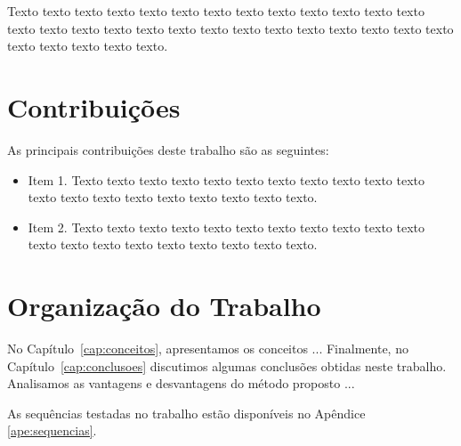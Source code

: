 Texto texto texto texto texto texto texto texto texto texto texto texto texto
texto texto texto texto texto texto texto texto texto texto texto texto texto
texto texto texto texto texto texto.

\section{Contribuições}
\label{sec:contribucoes}

As principais contribuições deste trabalho são as seguintes:

\begin{itemize}
  \item Item 1. Texto texto texto texto texto texto texto texto texto texto
  texto texto texto texto texto texto texto texto texto texto.

  \item Item 2. Texto texto texto texto texto texto texto texto texto texto
  texto texto texto texto texto texto texto texto texto texto.

\end{itemize}

\section{Organização do Trabalho}
\label{sec:organizacao_trabalho}

No Capítulo~\ref{cap:conceitos}, apresentamos os conceitos ... Finalmente, no
Capítulo~\ref{cap:conclusoes} discutimos algumas conclusões obtidas neste
trabalho. Analisamos as vantagens e desvantagens do método proposto ... 

As sequências testadas no trabalho estão disponíveis no Apêndice \ref{ape:sequencias}.
